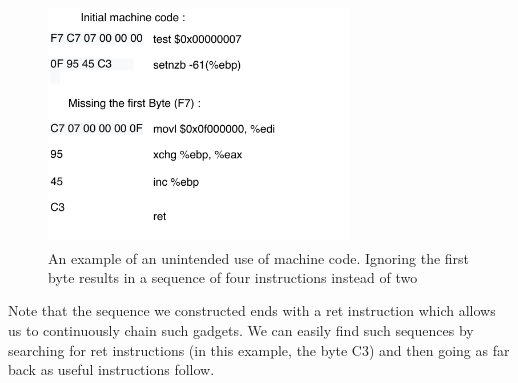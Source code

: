 \documentclass[10pt,twocolumn,a4paper]{article}
\begin{document}
\begin{figure}[h]
  \includegraphics[keepaspectratio,width=8cm]{fig/ByteCode}
  \caption{An example of an unintended use of machine code\textsuperscript{\cite{geometry}}. Ignoring the first byte results in a sequence of four instructions instead of two}
\end{figure}\newline
Note that the sequence we constructed ends with a ret instruction which allows us to continuously chain such gadgets.
We can easily find such sequences by searching for ret instructions (in this example, the byte C3) and then going as far back as useful instructions follow\cite{gadgets}.
\end{document}
